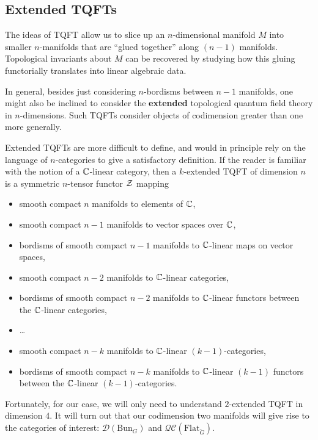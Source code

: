	\subsection{Extended TQFTs} %
	\label{sub:extended_tqfts}
		
	The ideas of TQFT allow us to slice up an $n$-dimensional manifold $M$ into smaller $n$-manifolds that are ``glued together'' along $(n-1)$ manifolds. Topological invariants about $M$ can be recovered by studying how this gluing functorially translates into linear algebraic data.
	
	In general, besides just considering $n$-bordisms between $n-1$ manifolds, one might also be inclined to consider the  \textbf{extended} topological quantum field theory in $n$-dimensions. Such TQFTs consider objects of codimension greater than one more generally. 
	
	Extended TQFTs are more difficult to define, and would in principle rely on the language of $n$-categories to give a satisfactory definition. If the reader is familiar with the notion of a $\mathbb{C}$-linear category, then a $k$-extended TQFT of dimension $n$ is \cite{nlab:extended_topological_quantum_field_theory} a symmetric $n$-tensor functor $\mathcal{Z}$ mapping
	\begin{itemize}
		\item smooth compact $n$ manifolds to elements of $\mathbb{C}$,
		\item smooth compact $n-1$ manifolds to vector spaces over $\mathbb{C}$,
		\item bordisms of smooth compact $n-1$ manifolds to $\mathbb{C}$-linear maps on vector spaces,
		\item smooth compact $n-2$ manifolds to $\mathbb{C}$-linear categories,
		\item bordisms of smooth compact $n-2$ manifolds to $\mathbb{C}$-linear functors between the $\mathbb{C}$-linear categories,
		\item \dots 
		\item smooth compact $n-k$ manifolds to $\mathbb{C}$-linear $(k-1)$-categories,
		\item bordisms of smooth compact $n-k$ manifolds to $\mathbb{C}$-linear $(k-1)$ functors between the $\mathbb{C}$-linear $(k-1)$-categories.
	\end{itemize}
	
	
	Fortunately, for our case, we will only need to understand $2$-extended TQFT in dimension $4$. It will turn out that our codimension two manifolds will give rise to the categories of interest: $\mathcal D(\mathrm{Bun}_G)$ and $\mathcal{QC}(\mathrm{Flat}_{\check G})$. %
	
